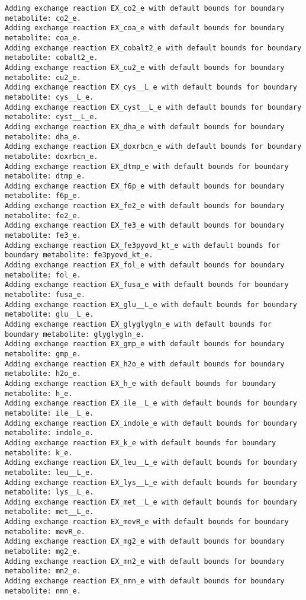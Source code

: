\documentclass[
  letterpaper,
  DIV=11,
  numbers=noendperiod]{scrartcl}
\begin{document}
\begin{verbatim}
Adding exchange reaction EX_co2_e with default bounds for boundary metabolite: co2_e.
Adding exchange reaction EX_coa_e with default bounds for boundary metabolite: coa_e.
Adding exchange reaction EX_cobalt2_e with default bounds for boundary metabolite: cobalt2_e.
Adding exchange reaction EX_cu2_e with default bounds for boundary metabolite: cu2_e.
Adding exchange reaction EX_cys__L_e with default bounds for boundary metabolite: cys__L_e.
Adding exchange reaction EX_cyst__L_e with default bounds for boundary metabolite: cyst__L_e.
Adding exchange reaction EX_dha_e with default bounds for boundary metabolite: dha_e.
Adding exchange reaction EX_doxrbcn_e with default bounds for boundary metabolite: doxrbcn_e.
Adding exchange reaction EX_dtmp_e with default bounds for boundary metabolite: dtmp_e.
Adding exchange reaction EX_f6p_e with default bounds for boundary metabolite: f6p_e.
Adding exchange reaction EX_fe2_e with default bounds for boundary metabolite: fe2_e.
Adding exchange reaction EX_fe3_e with default bounds for boundary metabolite: fe3_e.
Adding exchange reaction EX_fe3pyovd_kt_e with default bounds for boundary metabolite: fe3pyovd_kt_e.
Adding exchange reaction EX_fol_e with default bounds for boundary metabolite: fol_e.
Adding exchange reaction EX_fusa_e with default bounds for boundary metabolite: fusa_e.
Adding exchange reaction EX_glu__L_e with default bounds for boundary metabolite: glu__L_e.
Adding exchange reaction EX_glyglygln_e with default bounds for boundary metabolite: glyglygln_e.
Adding exchange reaction EX_gmp_e with default bounds for boundary metabolite: gmp_e.
Adding exchange reaction EX_h2o_e with default bounds for boundary metabolite: h2o_e.
Adding exchange reaction EX_h_e with default bounds for boundary metabolite: h_e.
Adding exchange reaction EX_ile__L_e with default bounds for boundary metabolite: ile__L_e.
Adding exchange reaction EX_indole_e with default bounds for boundary metabolite: indole_e.
Adding exchange reaction EX_k_e with default bounds for boundary metabolite: k_e.
Adding exchange reaction EX_leu__L_e with default bounds for boundary metabolite: leu__L_e.
Adding exchange reaction EX_lys__L_e with default bounds for boundary metabolite: lys__L_e.
Adding exchange reaction EX_met__L_e with default bounds for boundary metabolite: met__L_e.
Adding exchange reaction EX_mevR_e with default bounds for boundary metabolite: mevR_e.
Adding exchange reaction EX_mg2_e with default bounds for boundary metabolite: mg2_e.
Adding exchange reaction EX_mn2_e with default bounds for boundary metabolite: mn2_e.
Adding exchange reaction EX_nmn_e with default bounds for boundary metabolite: nmn_e.

\end{verbatim}
\end{document}
